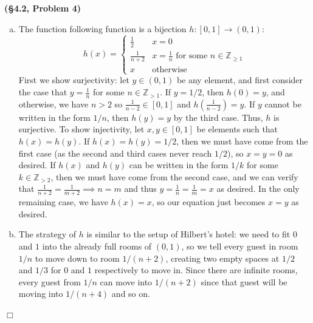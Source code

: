 \documentclass[12pt]{article}
\theoremstyle{definition}
\newenvironment{Solution}{\noindent {\sc Solution.}}{$\Box$ \vspace{2 ex}}
\begin{document}
\vspace{0.5cm}

\begin{Solution}
{\bf (\S4.2, Problem 4)}\\
\begin{enumerate}[(a)]
\item The function following function is a bijection $h : [0,1] \to (0, 1)$: \[ h(x) = \begin{cases}\frac{1}{2} & x = 0 \\ \frac{1}{n+2} & x = \frac{1}{n} \text{ for some } n \in \mathbb Z_{\ge 1} \\
x & \text{otherwise}\end{cases}\] 
First we show surjectivity: let $y \in (0, 1)$ be any element, and first consider the case that $y = \frac{1}{n}$ for some $n \in \mathbb Z_{> 1}$. If $y=1/2$, then $h(0)=y$, and otherwise, we have $n>2$ so $\frac{1}{n-2} \in [0,1]$ and $h\left(\frac{1}{n-2}\right) = y$. If $y$ cannot be written in the form $1/n$, then $h(y) = y$ by the third case. Thus, $h$ is surjective. To show injectivity, let $x,y \in [0,1]$ be elements such that $h(x) = h(y)$. If $h(x)=h(y)=1/2$, then we must have come from the first case (as the second and third cases never reach $1/2$), so $x=y=0$ as desired. If $h(x)$ and $h(y)$ can be written in the form $1/k$ for some $k \in \mathbb Z_{> 2}$, then we must have come from the second case, and we can verify that $\frac{1}{n+2} = \frac{1}{m+2} \implies n = m$ and thus $y = \frac{1}{n} = \frac{1}{m} = x$ as desired. In the only remaining case, we have $h(x)=x$, so our equation just becomes $x=y$ as desired.
\item The strategy of $h$ is similar to the setup of Hilbert's hotel: we need to fit $0$ and $1$ into the already full rooms of $(0, 1)$, so we tell every guest in room $1/n$ to move down to room $1/(n+2)$, creating two empty spaces at $1/2$ and $1/3$ for $0$ and $1$ respectively to move in. Since there are infinite rooms, every guest from $1/n$ can move into $1/(n+2)$ since that guest will be moving into $1/(n+4)$ and so on.
\end{enumerate}
\end{Solution}
\end{document}
